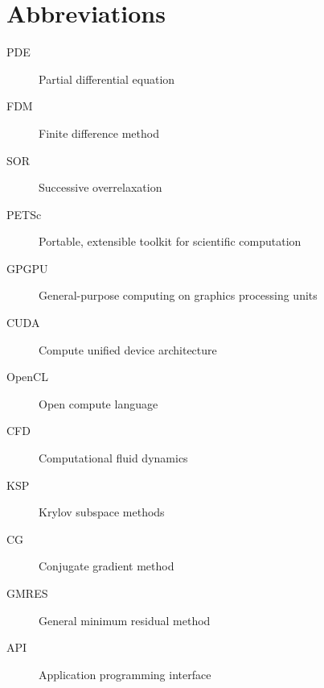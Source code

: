 \chapter{Abbreviations}

\begin{description}
	\item[PDE] Partial differential equation
	\item[FDM] Finite difference method
	\item[SOR] Successive overrelaxation
	\item[PETSc] Portable, extensible toolkit for scientific computation
	\item[GPGPU] General-purpose computing on graphics processing units
	\item[CUDA] Compute unified device architecture
	\item[OpenCL] Open compute language
	\item[CFD] Computational fluid dynamics
	\item[KSP] Krylov subspace methods
	\item[CG] Conjugate gradient method
	\item[GMRES] General minimum residual method
	\item[API] Application programming interface
\end{description}
